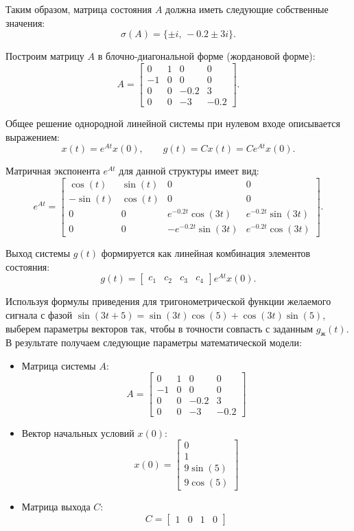\documentclass[14pt,a4paper]{extarticle}
\begin{document}
Таким образом, матрица состояния $A$ должна иметь следующие собственные значения:
\[
    \sigma(A) = \{\pm i, \, -0.2 \pm 3i\}.
\]

Построим матрицу $A$ в блочно-диагональной форме (жордановой форме):
\[
    A = \begin{bmatrix}
        0 & 1 & 0 & 0 \\
        -1 & 0 & 0 & 0 \\
        0 & 0 & -0.2 & 3 \\
        0 & 0 & -3 & -0.2
    \end{bmatrix}.
\]

Общее решение однородной линейной системы при нулевом входе описывается выражением:
\[
    x(t) = e^{At}x(0), \qquad g(t) = C x(t) = C e^{At} x(0).
\]

Матричная экспонента $e^{At}$ для данной структуры имеет вид:
\[
    e^{At} = \begin{bmatrix}
        \cos(t) & \sin(t) & 0 & 0 \\
        -\sin(t) & \cos(t) & 0 & 0 \\
        0 & 0 & e^{-0.2t}\cos(3t) & e^{-0.2t}\sin(3t) \\
        0 & 0 & -e^{-0.2t}\sin(3t) & e^{-0.2t}\cos(3t)
    \end{bmatrix}.
\]

Выход системы $g(t)$ формируется как линейная комбинация элементов состояния:
\[
    g(t) = \begin{bmatrix} c_1 & c_2 & c_3 & c_4 \end{bmatrix} e^{At} x(0).
\]

Используя формулы приведения для тригонометрической функции желаемого сигнала с фазой $\sin(3t + 5) = \sin(3t)\cos(5) + \cos(3t)\sin(5)$, выберем параметры векторов так, чтобы в точности совпасть с заданным $g_{\text{ж}}(t)$. В результате получаем следующие параметры математической модели:
\begin{itemize}
    \item Матрица системы $A$:
    \[
        A = \begin{bmatrix}
            0 & 1 & 0 & 0 \\
            -1 & 0 & 0 & 0 \\
            0 & 0 & -0.2 & 3 \\
            0 & 0 & -3 & -0.2
        \end{bmatrix}
    \]
    \item Вектор начальных условий $x(0)$:
    \[
        x(0) = \begin{bmatrix}
            0 \\ 1 \\ 9\sin(5) \\ 9\cos(5)
        \end{bmatrix}
    \]
    \item Матрица выхода $C$:
    \[
        C = \begin{bmatrix} 1 & 0 & 1 & 0 \end{bmatrix}
    \]
\end{itemize}
\end{document}
